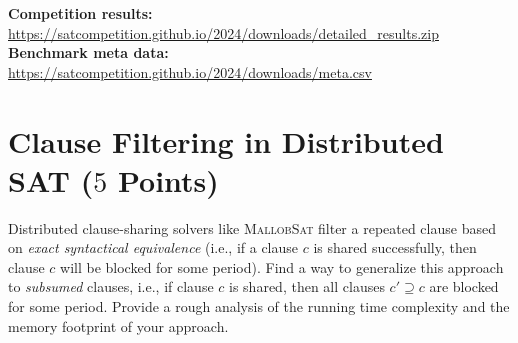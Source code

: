 \documentclass[a4paper]{article}
\begin{document}
\noindent
\textbf{Competition results:} \url{https://satcompetition.github.io/2024/downloads/detailed_results.zip}\\
\textbf{Benchmark meta data:}
\url{https://satcompetition.github.io/2024/downloads/meta.csv}


\section{Clause Filtering in Distributed SAT ($5$ Points)}

Distributed clause-sharing solvers like \textsc{MallobSat} filter a repeated clause based on \textit{exact syntactical equivalence} (i.e., if a clause $c$ is shared successfully, then clause $c$ will be blocked for some period).
Find a way to generalize this approach to \textit{subsumed} clauses, i.e., if clause $c$ is shared, then all clauses $c' \supseteq c$ are blocked for some period.
Provide a rough analysis of the running time complexity and the memory footprint of your approach.
\end{document}
